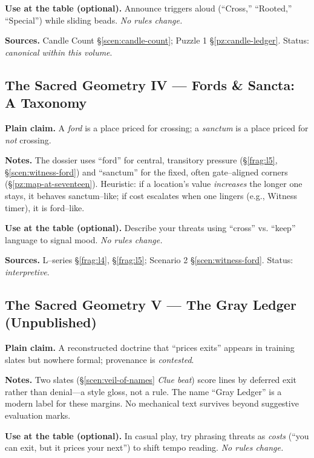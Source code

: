 \documentclass[11pt]{article}
\numberwithin{equation}{section} %
\theoremstyle{plain} %
\theoremstyle{definition} %
\theoremstyle{remark} %
\begin{document}
\medskip
\noindent\textbf{Use at the table (optional).} Announce triggers aloud (“Cross,” “Rooted,” “Special”) while sliding beads. \emph{No rules change.}

\medskip
\noindent\textbf{Sources.} Candle Count \S\ref{scen:candle-count}; Puzzle 1 \S\ref{pz:candle-ledger}. Status: \emph{canonical within this volume}.


\subsection{The Sacred Geometry IV — Fords \& Sancta: A Taxonomy}
\label{geometry:ford-vs-sanctum}

\noindent\textbf{Plain claim.} A \emph{ford} is a place priced for crossing; a \emph{sanctum} is a place priced for \emph{not} crossing.

\medskip
\noindent\textbf{Notes.} The dossier uses “ford” for central, transitory pressure (\S\ref{frag:l5}, \S\ref{scen:witness-ford}) and “sanctum” for the fixed, often gate–aligned corners (\S\ref{pz:map-at-seventeen}). Heuristic: if a location’s value \emph{increases} the longer one stays, it behaves sanctum–like; if cost escalates when one lingers (e.g., Witness timer), it is ford–like.

\medskip
\noindent\textbf{Use at the table (optional).} Describe your threats using “cross” vs. “keep” language to signal mood. \emph{No rules change.}

\medskip
\noindent\textbf{Sources.} L–series \S\ref{frag:l4}, \S\ref{frag:l5}; Scenario 2 \S\ref{scen:witness-ford}. Status: \emph{interpretive}.

\subsection{The Sacred Geometry V — The Gray Ledger (Unpublished)}
\label{geometry:gray-ledger}

\noindent\textbf{Plain claim.} A reconstructed doctrine that “prices exits” appears in training slates but nowhere formal; provenance is \emph{contested}.

\medskip
\noindent\textbf{Notes.} Two slates (\S\ref{scen:veil-of-names} \emph{Clue beat}) score lines by deferred exit rather than denial—a style gloss, not a rule. The name “Gray Ledger” is a modern label for these margins. No mechanical text survives beyond suggestive evaluation marks.

\medskip
\noindent\textbf{Use at the table (optional).} In casual play, try phrasing threats as \emph{costs} (“you can exit, but it prices your next”) to shift tempo reading. \emph{No rules change.}
\end{document}
